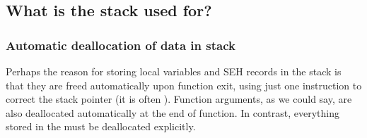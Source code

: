 \subsection{What is the stack used for?}



\EN{}
\RU{}
\PTBR{}




\subsubsection{Automatic deallocation of data in stack}

Perhaps the reason for storing local variables and SEH records in the stack is that they are freed automatically upon function exit,
using just one instruction to correct the stack pointer (it is often \ADD).
Function arguments, as we could say, are also deallocated automatically at the end of function.
In contrast, everything stored in the  must be deallocated explicitly.

\EN{}
\RU{}
\PTBR{}


